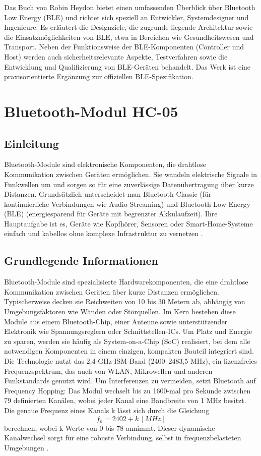 Das Buch von Robin Heydon \cite{Heydon:2012} bietet einen umfassenden Überblick über Bluetooth Low Energy (BLE) und richtet sich speziell an Entwickler, Systemdesigner und Ingenieure. Es erläutert die Designziele, die zugrunde liegende Architektur sowie die Einsatzmöglichkeiten von BLE, etwa in Bereichen wie Gesundheitswesen und Transport. Neben der Funktionsweise der BLE-Komponenten (Controller und Host) werden auch sicherheitsrelevante Aspekte, Testverfahren sowie die Entwicklung und Qualifizierung von BLE-Geräten behandelt. Das Werk ist eine praxisorientierte Ergänzung zur offiziellen BLE-Spezifikation.


\chapter{Bluetooth-Modul HC-05} \label{Bluetooth}

\section{Einleitung}
Bluetooth-Module sind elektronische Komponenten, die drahtlose Kommunikation zwischen Geräten ermöglichen. Sie wandeln elektrische Signale in Funkwellen um und sorgen so für eine  zuverlässige Datenübertragung über kurze Distanzen. Grundsätzlich unterscheidet man Bluetooth Classic (für kontinuierliche Verbindungen wie Audio-Streaming) und Bluetooth Low Energy (BLE) (energiesparend für Geräte mit begrenzter Akkulaufzeit). Ihre Hauptaufgabe ist es, Geräte wie Kopfhörer, Sensoren oder Smart-Home-Systeme einfach und kabellos ohne komplexe Infrastruktur zu vernetzen \cite{Sauter:2022}.

\section{Grundlegende Informationen}
Bluetooth-Module sind spezialisierte Hardwarekomponenten, die eine drahtlose Kommunikation zwischen Geräten über kurze Distanzen ermöglichen. Typischerweise decken sie Reichweiten von 10 bis 30 Metern ab, abhängig von Umgebungsfaktoren wie Wänden oder Störquellen. Im Kern bestehen diese Module aus einem Bluetooth-Chip, einer Antenne sowie unterstützender Elektronik wie Spannungsreglern oder Schnittstellen-ICs. Um Platz und Energie zu sparen, werden sie häufig als System-on-a-Chip (SoC) realisiert, bei dem alle notwendigen Komponenten in einem einzigen, kompakten Bauteil integriert sind.
Die Technologie nutzt das 2,4-GHz-ISM-Band (2400–2483,5 MHz), ein lizenzfreies Frequenzspektrum, das auch von WLAN, Mikrowellen und anderen Funkstandards genutzt wird. Um Interferenzen zu vermeiden, setzt Bluetooth auf Frequency Hopping: Das Modul wechselt bis zu 1600-mal pro Sekunde zwischen 79 definierten Kanälen, wobei jeder Kanal eine Bandbreite von 1 MHz besitzt. Die genaue Frequenz eines Kanals k lässt sich durch die Gleichung
\begin{equation}
    f_k =2402+k \: [MHz] 
\end{equation}
berechnen, wobei k Werte von 0 bis 78 annimmt. Dieser dynamische Kanalwechsel sorgt für eine robuste Verbindung, selbst in frequenzbelasteten Umgebungen \cite{Sauter:2022}.

